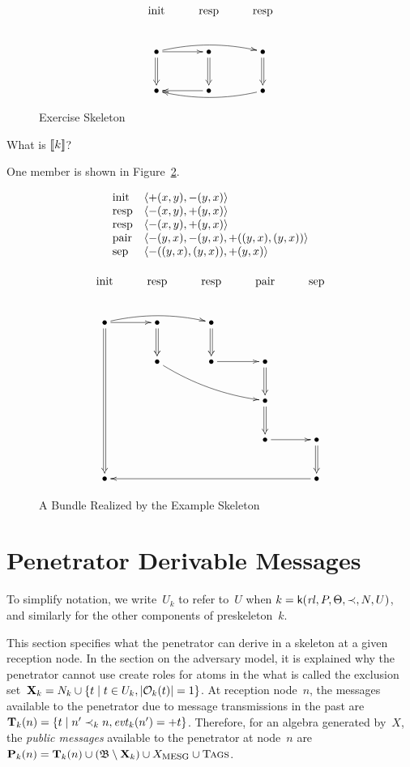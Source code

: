 \documentclass[12pt]{article}
\theoremstyle{definition}
\newcommand{\scap}[1]{\ensuremath{\mathop{\relax
                    \smash{\mbox{\sc#1}}}\!\mathop{\vphantom{#1}}\nolimits}}
\newcommand{\base}{\ensuremath{\mathfrak B}}
\newcommand{\pubmsg}{\mathbf{P}}
\newcommand{\excl}{\mathbf{X}}
\newcommand{\transpred}{\mathbf{T}}
\newcommand{\evt}{\fn{evt}}
\newcommand{\skel}{\mathsf{k}}
\newcommand{\rl}{\fn{rl}}
\begin{document}
\begin{figure}
$$\xymatrix{
\txt{\strut init}&\txt{\strut resp}&\txt{\strut resp}\\
\bullet\ar@{=>}[d]\ar@/^/[rr]\ar[r]&\bullet\ar@{=>}[d]&\bullet\ar@{=>}[d]\\
\bullet&\bullet\ar[l]&\bullet\ar@/^/[ll]}$$
\caption{Exercise Skeleton}\label{fig:exercise}
\end{figure}

What is $[\![k]\!]$?

One member is shown in Figure~\ref{fig:bundle}.

\begin{figure}
$$\begin{array}{ll}
\mbox{init}&\langle\mathord +(x,y),\mathord -(y,x)\rangle\\
\mbox{resp}&\langle\mathord -(x,y),\mathord +(y,x)\rangle\\
\mbox{resp}&\langle\mathord -(x,y),\mathord +(y,x)\rangle\\
\mbox{pair}&\langle\mathord -(y,x),\mathord -(y,x),\mathord +((y,x),(y,x))\rangle\\
\mbox{sep}&\langle\mathord -((y,x),(y,x)),\mathord +(y,x)\rangle
\end{array}$$

$$\xymatrix{
\txt{\strut init}&\txt{\strut resp}&\txt{\strut resp}&\txt{\strut pair}&\txt{\strut sep}\\
\bullet\ar@{=>}[dddd]\ar@/^/[rr]\ar[r]&\bullet\ar@{=>}[d]&\bullet\ar@{=>}[d]&&\\
&\bullet\ar@/_/[rrd]&\bullet\ar[r]&\bullet\ar@{=>}[d]&\\
&&&\bullet\ar@{=>}[d]&\\
&&&\bullet\ar[r]&\bullet\ar@{=>}[d]\\
\bullet&&&&\bullet\ar[llll]}$$
\caption{A Bundle Realized by the Example Skeleton}\label{fig:bundle}
\end{figure}

\section{Penetrator Derivable Messages}\label{sec:pen deriv mesgs}

To simplify notation, we write~$U_k$ to refer to~$U$ when
$k=\skel(\rl,P,\Theta,\prec,N,U)$, and similarly for the other
components of preskeleton~$k$.

This section specifies what the penetrator can derive in a skeleton at
a given reception node.  In the section on the adversary model, it is
explained why the penetrator cannot use create roles for atoms in the
what is called the exclusion set~$\excl_k=N_k\cup\{t\mid t\in U_k,
|\orig_k(t)|=1\}$.  At reception node~$n$, the messages available to
the penetrator due to message transmissions in the past
are~$\transpred_k(n)=\{t\mid n'\prec_k n, \evt_k(n')=\outbnd t\}$.
Therefore, for an algebra generated by~$X$, the \emph{public messages}
available to the penetrator at node~$n$ are
$\pubmsg_k(n)=\transpred_k(n)\cup(\base\setminus\excl_k)\cup X_{\scap{mesg}} \cup \scap{Tags}$.
\end{document}
